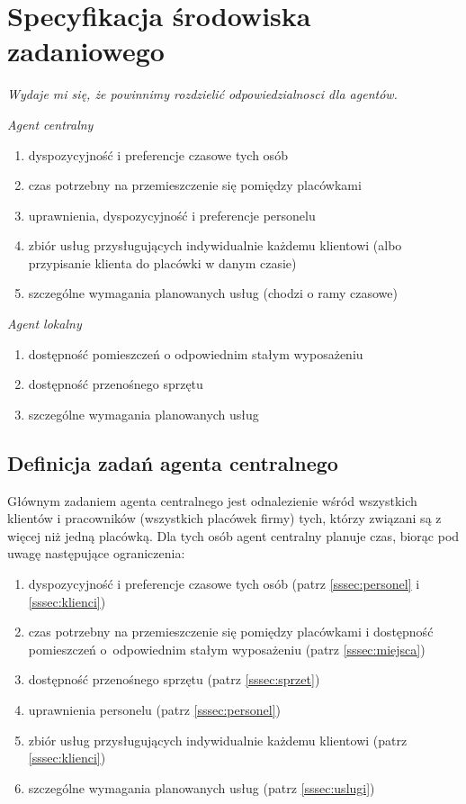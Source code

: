 ﻿\section{Specyfikacja środowiska zadaniowego}
\emph{Wydaje mi się, że powinnimy rozdzielić odpowiedzialnosci dla agentów.}

\emph{Agent centralny}
\begin{enumerate}
	\item{dyspozycyjność i preferencje czasowe tych osób}
	\item{czas potrzebny na przemieszczenie się pomiędzy placówkami}
	\item{uprawnienia, dyspozycyjność i preferencje personelu}
	\item{zbiór usług przysługujących indywidualnie każdemu klientowi
		(albo przypisanie klienta do placówki w danym czasie)}
	\item{szczególne wymagania planowanych usług
		(chodzi o ramy czasowe)}
\end{enumerate}

\emph{Agent lokalny}
\begin{enumerate}
	\item{dostępność pomieszczeń o odpowiednim stałym wyposażeniu}
	\item{dostępność przenośnego sprzętu}
	\item{szczególne wymagania planowanych usług}
\end{enumerate}

\subsection{Definicja zadań agenta centralnego}\label{ssec:zadaniaCentralny}
Głównym zadaniem agenta centralnego jest odnalezienie wśród wszystkich klientów
i pracowników (wszystkich placówek firmy) tych, którzy związani są z więcej niż jedną placówką.
Dla tych osób agent centralny planuje czas, biorąc pod uwagę następujące ograniczenia:
\begin{enumerate}
	\item{dyspozycyjność i preferencje czasowe tych osób (patrz \ref{sssec:personel} i \ref{sssec:klienci})}
	\item{czas potrzebny na przemieszczenie się pomiędzy placówkami
		i dostępność pomieszczeń o~odpowiednim stałym wyposażeniu (patrz \ref{sssec:miejsca})}
	\item{dostępność przenośnego sprzętu (patrz \ref{sssec:sprzet})}
	\item{uprawnienia personelu (patrz \ref{sssec:personel})}
	\item{zbiór usług przysługujących indywidualnie każdemu klientowi (patrz \ref{sssec:klienci})}
	\item{szczególne wymagania planowanych usług (patrz \ref{sssec:uslugi})}
\end{enumerate}

